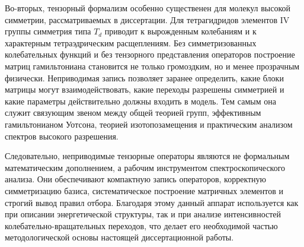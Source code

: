 Во-вторых, тензорный формализм особенно существенен для молекул высокой
симметрии, рассматриваемых в диссертации. Для тетрагидридов элементов IV
группы симметрия типа $T_d$ приводит к вырожденным колебаниям и к
характерным тетраэдрическим расщеплениям. Без симметризованных
колебательных функций и без тензорного представления операторов построение
матриц гамильтониана становится не только громоздким, но и менее
прозрачным физически. Неприводимая запись позволяет заранее определить,
какие блоки матрицы могут взаимодействовать, какие переходы разрешены
симметрией и какие параметры действительно должны входить в модель. Тем
самым она служит связующим звеном между общей теорией групп, эффективным
гамильтонианом Уотсона, теорией изотопозамещения и практическим анализом
спектров высокого разрешения.

Следовательно, неприводимые тензорные операторы являются не формальным
математическим дополнением, а рабочим инструментом спектроскопического
анализа. Они обеспечивают компактную запись операторов, корректную
симметризацию базиса, систематическое построение матричных элементов и
строгий вывод правил отбора. Благодаря этому данный аппарат используется
как при описании энергетической структуры, так и при анализе интенсивностей
колебательно-вращательных переходов, что делает его необходимой частью
методологической основы настоящей диссертационной работы.





